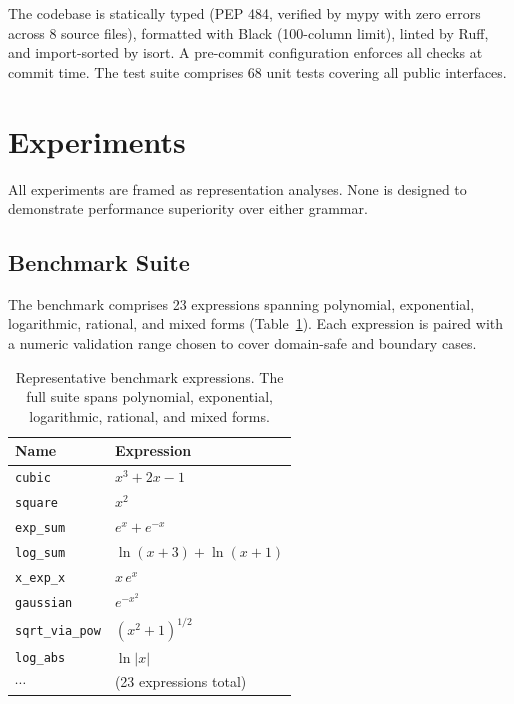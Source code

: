 \documentclass[11pt,a4paper]{article}
\begin{document}
The codebase is statically typed (PEP 484, verified by mypy with zero
errors across 8 source files), formatted with Black (100-column limit),
linted by Ruff, and import-sorted by isort. A pre-commit configuration
enforces all checks at commit time. The test suite comprises 68 unit
tests covering all public interfaces.

\section{Experiments}
\label{sec:experiments}

All experiments are framed as representation analyses. None is designed
to demonstrate performance superiority over either grammar.

\subsection{Benchmark Suite}

The benchmark comprises 23 expressions spanning polynomial, exponential,
logarithmic, rational, and mixed forms (Table~\ref{tab:benchmark}). Each
expression is paired with a numeric validation range chosen to cover
domain-safe and boundary cases.

\begin{table}[h]
\centering
\small
\begin{tabular}{ll}
\toprule
\textbf{Name} & \textbf{Expression} \\
\midrule
\texttt{cubic}         & $x^3 + 2x - 1$ \\
\texttt{square}        & $x^2$ \\
\texttt{exp\_sum}      & $e^x + e^{-x}$ \\
\texttt{log\_sum}      & $\ln(x+3) + \ln(x+1)$ \\
\texttt{x\_exp\_x}     & $x\,e^x$ \\
\texttt{gaussian}      & $e^{-x^2}$ \\
\texttt{sqrt\_via\_pow}& $(x^2+1)^{1/2}$ \\
\texttt{log\_abs}      & $\ln|x|$ \\
$\cdots$               & (23 expressions total) \\
\bottomrule
\end{tabular}
\caption{Representative benchmark expressions. The full suite spans
polynomial, exponential, logarithmic, rational, and mixed forms.}
\label{tab:benchmark}
\end{table}
\end{document}
